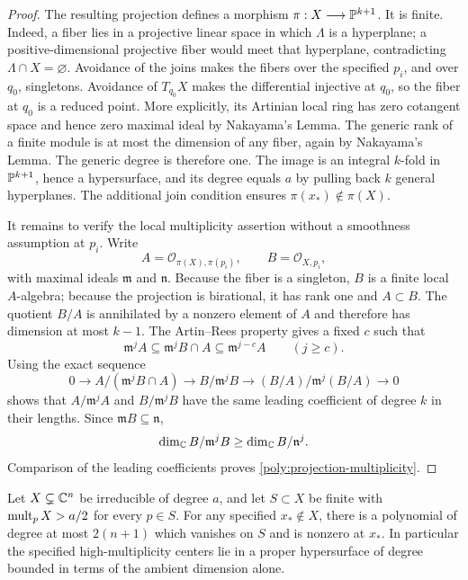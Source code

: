 \begin{proof}
The resulting projection defines a morphism $\pi:X\longrightarrow
\mathbb P^{k+1}$.  It is finite.  Indeed, a fiber lies in a projective
linear space in which $\Lambda$ is a hyperplane; a positive-dimensional
projective fiber would meet that hyperplane, contradicting
$\Lambda\cap X=\varnothing$.  Avoidance of the joins makes the
fibers over the specified $p_i$, and over $q_0$, singletons.
Avoidance of $T_{q_0}X$ makes the differential injective at $q_0$,
so the fiber at $q_0$ is a reduced point.  More explicitly, its
Artinian local ring has zero cotangent space and hence zero maximal
ideal by Nakayama's Lemma.  The generic rank of a finite module is
at most the dimension of any fiber, again by Nakayama's Lemma.
The generic degree is therefore one.  The image is an integral
$k$-fold in $\mathbb P^{k+1}$, hence a hypersurface, and its degree equals
$a$ by pulling back $k$ general hyperplanes.  The additional join
condition ensures $\pi(x_*)\notin\pi(X)$.

It remains to verify the local multiplicity assertion without a
smoothness assumption at $p_i$.  Write
\[
 A=\mathcal O_{\pi(X),\pi(p_i)},\qquad
 B=\mathcal O_{X,p_i},
\]
with maximal ideals $\mathfrak m$ and $\mathfrak n$.  Because the
fiber is a singleton, $B$ is a finite local $A$-algebra; because
the projection is birational, it has rank one and $A\subset B$.
The quotient $B/A$ is annihilated by a nonzero element of $A$ and
therefore has dimension at most $k-1$.  The Artin--Rees property
gives a fixed $c$ such that
\[
 \mathfrak m^jA\subseteq\mathfrak m^jB\cap A
                  \subseteq\mathfrak m^{j-c}A\qquad(j\ge c).
\]
Using the exact sequence
\[
 0\longrightarrow A/(\mathfrak m^jB\cap A)
 \longrightarrow B/\mathfrak m^jB
 \longrightarrow (B/A)/\mathfrak m^j(B/A)\longrightarrow0
\]
shows that $A/\mathfrak m^jA$ and $B/\mathfrak m^jB$ have the same
leading coefficient of degree $k$ in their lengths.  Since
$\mathfrak mB\subseteq\mathfrak n$,
\[
 \dim_{\mathbb C} B/\mathfrak m^jB\ge
       \dim_{\mathbb C}B/\mathfrak n^j.
\]
Comparison of the leading coefficients proves
\eqref{poly:projection-multiplicity}.
\end{proof}

\begin{corollary}
\label{poly:high-multiplicity}
Let $X\subsetneq\mathbb C^n$ be irreducible of degree $a$, and let
$S\subset X$ be finite with $\operatorname{mult}_pX>a/2$ for every $p\in S$.
For any specified $x_*\notin X$, there is a polynomial of degree
at most $2(n+1)$ which vanishes on $S$ and is nonzero at $x_*$.
In particular the specified high-multiplicity centers lie in a
proper hypersurface of degree bounded in terms of the ambient
dimension alone.
\end{corollary}


